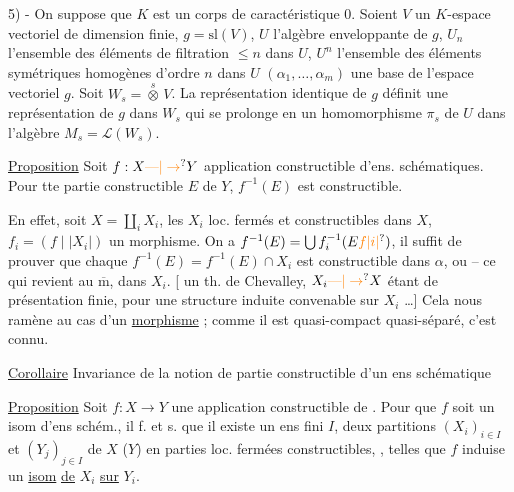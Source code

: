 \margin{\handwritten{$\unsure{\pi|\Pi}$}}
5) - On suppose que $K$ est un corps de caractéristique 0. Soient $V$ un $K$-espace vectoriel de dimension finie, $g=\mathrm{sl}(V)$, $U$ l'algèbre enveloppante de $g$, $U_n$ l'ensemble des éléments de filtration $\leq n$ dans $U$, $U^n$ l'ensemble des éléments symétriques homogènes d'ordre $n$ dans $U$ $(\alpha_1,\ldots,\alpha_m)$ une base de l'espace vectoriel $g$. Soit $W_s=\overset{s}{\otimes}\,V$. La représentation identique de $g$ définit une représentation de $g$ dans $W_s$ qui se prolonge en un homomorphisme $\pi_s$ de $U$ dans l'algèbre $M_s=\mathcal{L}(W_s)$.


\uline{Proposition} Soit $f:X\unsure{\text{---}|\to}Y$  application constructible d'ens. schématiques. Pour tte partie constructible $E$ de $Y$, $f^{-1}(E)$ est constructible.


En effet, soit $X=\coprod_i X_i$, les $X_i$ loc. fermés et constructibles dans $X$,  $f_i=(f\mid |X_i|)$ un morphisme. On a $f^{-1}(E)=\bigcup f_i^{-1}(E\unsure{f|i|{}})$, il suffit de prouver que chaque $f^{-1}(E)=f^{-1}(E)\cap X_i$ est constructible dans $\alpha$, ou -- ce qui revient au $\overline{\mathrm m}$, dans $X_i$. [  un th. de Chevalley,  $X_i\unsure{\text{---}|\to}X$ étant de présentation finie, pour une structure induite convenable sur $X_i$ \ldots] Cela nous ramène au cas d'un \uline{morphisme}  ; comme il est quasi-compact quasi-séparé, c'est connu.


\uline{Corollaire} Invariance de la notion de partie constructible d'un ens schématique

\uline{Proposition} Soit $f:X\longrightarrow Y$ une application constructible de . Pour que $f$ soit un isom d'ens schém., il f. et s. que il existe  un  ens fini $I$, deux partitions $(X_i)_{i\in I}$ et $(Y_j)_{j\in I}$ de $X$ ($Y$) en parties loc. fermées constructibles, , telles que $f$ induise un \uline{isom} \uline{de} $X_i$ \uline{sur} $Y_i$.

